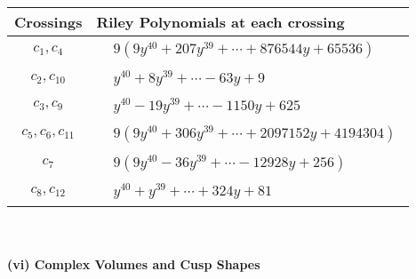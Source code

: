 \documentclass[1p]{elsarticle_modified}
\theoremstyle{definition}
\begin{document}
\begin{tabular}{m{50pt}|m{274pt}}
Crossings & \hspace{64pt}Riley Polynomials at each crossing \\
\hline $$\begin{aligned}c_{1},c_{4}\end{aligned}$$&$\begin{aligned}
&9(9 y^{40}+207 y^{39}+\cdots+876544 y+65536)
\end{aligned}$\\
\hline $$\begin{aligned}c_{2},c_{10}\end{aligned}$$&$\begin{aligned}
&y^{40}+8 y^{39}+\cdots-63 y+9
\end{aligned}$\\
\hline $$\begin{aligned}c_{3},c_{9}\end{aligned}$$&$\begin{aligned}
&y^{40}-19 y^{39}+\cdots-1150 y+625
\end{aligned}$\\
\hline $$\begin{aligned}c_{5},c_{6},c_{11}\end{aligned}$$&$\begin{aligned}
&9(9 y^{40}+306 y^{39}+\cdots+2097152 y+4194304)
\end{aligned}$\\
\hline $$\begin{aligned}c_{7}\end{aligned}$$&$\begin{aligned}
&9(9 y^{40}-36 y^{39}+\cdots-12928 y+256)
\end{aligned}$\\
\hline $$\begin{aligned}c_{8},c_{12}\end{aligned}$$&$\begin{aligned}
&y^{40}+y^{39}+\cdots+324 y+81
\end{aligned}$\\
\hline
\end{tabular}\\~\\
\newpage\flushleft \textbf{(vi) Complex Volumes and Cusp Shapes}
\end{document}
